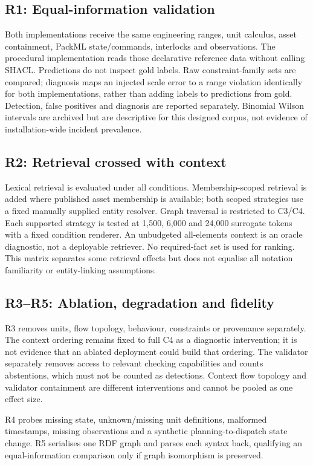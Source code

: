 \documentclass[10pt,journal,letterpaper]{IEEEtran}
\begin{document}
\subsection{R1: Equal-information validation}
Both implementations receive the same engineering ranges, unit calculus,
asset containment, PackML state/commands, interlocks and observations. The
procedural implementation reads those declarative reference data without calling
SHACL. Predictions do not inspect gold labels. Raw constraint-family sets are
compared; diagnosis maps an injected scale error to a range violation identically
for both implementations, rather than adding labels to predictions from gold.
Detection, false positives and diagnosis are reported separately. Binomial Wilson
intervals are archived but are descriptive for this designed corpus, not evidence
of installation-wide incident prevalence.

\subsection{R2: Retrieval crossed with context}
Lexical retrieval is evaluated under all conditions. Membership-scoped retrieval
is added where published asset membership is available; both scoped strategies
use a fixed manually supplied entity resolver. Graph traversal is restricted to
C3/C4. Each supported strategy is tested at 1,500, 6,000 and 24,000 surrogate
tokens with a fixed condition renderer. An unbudgeted all-elements context is an
oracle diagnostic, not a deployable retriever. No required-fact set is used for
ranking. This matrix separates some retrieval effects but does not equalise all
notation familiarity or entity-linking assumptions.

\subsection{R3--R5: Ablation, degradation and fidelity}
R3 removes units, flow topology, behaviour, constraints or provenance separately.
The context ordering remains fixed to full C4 as a diagnostic intervention;
it is not evidence that an ablated deployment could build that ordering. The
validator separately removes access to relevant checking capabilities and counts
abstentions, which must not be counted as detections. Context flow topology and
validator containment are different interventions and cannot be pooled as one
effect size.

R4 probes missing state, unknown/missing unit definitions, malformed timestamps,
missing observations and a synthetic planning-to-dispatch state change. R5
serialises one RDF graph and parses each syntax back, qualifying an
equal-information comparison only if graph isomorphism is preserved.
\end{document}
